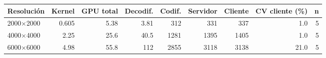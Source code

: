 \begin{tabular}{lrrrrrrrr}
\toprule
Resolución & Kernel & GPU total & Decodif. & Codif. & Servidor & Cliente & CV cliente (\%) & n \\
\midrule
2000$\times$2000 & 0.605 & 5.38 & 3.81 & 312 & 331 & 337 & 1.0 & 5 \\
4000$\times$4000 & 2.25 & 25.6 & 40.5 & 1281 & 1395 & 1405 & 1.0 & 5 \\
6000$\times$6000 & 4.98 & 55.8 & 112 & 2855 & 3118 & 3138 & 21.0 & 5 \\
\bottomrule
\end{tabular}
